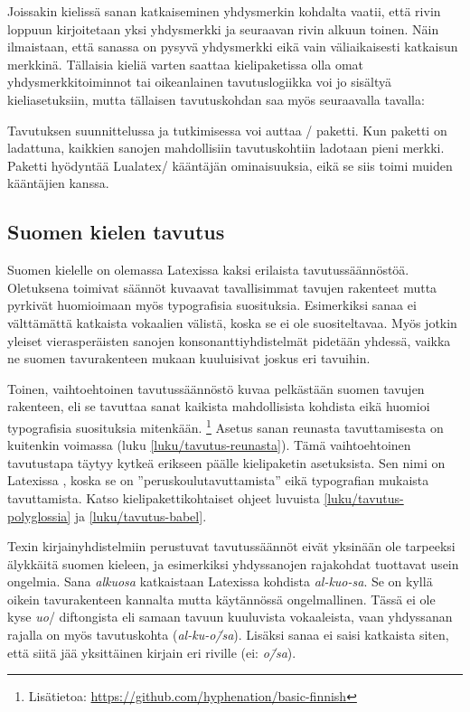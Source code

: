 \noindent
Joissakin kielissä sanan katkaiseminen yhdysmerkin kohdalta vaatii, että
rivin loppuun kirjoitetaan yksi yhdysmerkki ja seuraavan rivin alkuun
toinen. Näin ilmaistaan, että sanassa on pysyvä yhdysmerkki eikä vain
väliaikaisesti katkaisun merkkinä. Tällaisia kieliä varten saattaa
kielipaketissa olla omat yhdysmerkkitoiminnot tai oikeanlainen
tavutuslogiikka voi jo sisältyä kieliasetuksiin, mutta tällaisen
tavutuskohdan saa myös seuraavalla tavalla:

\begin{koodilohkosis}
\discretionary{-}{-}{-}
\end{koodilohkosis}

\noindent
Tavutuksen suunnittelussa ja tutkimisessa voi auttaa
\-/ paketti. Kun paketti on ladattuna,
kaikkien sanojen mahdollisiin tavutuskohtiin ladotaan pieni merkki.
Paketti hyödyntää Lualatex\-/ kääntäjän ominaisuuksia, eikä se siis
toimi muiden kääntäjien kanssa.

\subsection{Suomen kielen tavutus}
\label{luku/suomi-tavutus}

Suomen kielelle on olemassa Latexissa kaksi erilaista tavutussäännöstöä.
Oletuksena toimivat säännöt kuvaavat tavallisimmat tavujen rakenteet
mutta pyrkivät huomioimaan myös typografisia suosituksia. Esimerkiksi
sanaa ei välttämättä katkaista vokaalien välistä, koska se ei ole
suositeltavaa. Myös jotkin yleiset vierasperäisten sanojen
konsonanttiyhdistelmät pidetään yhdessä, vaikka ne suomen tavurakenteen
mukaan kuuluisivat joskus eri tavuihin.

Toinen, vaihtoehtoinen tavutussäännöstö kuvaa pelkästään suomen tavujen
rakenteen, eli se tavuttaa sanat kaikista mahdollisista kohdista eikä
huomioi typografisia suosituksia mitenkään.%
\footnote{Lisätietoa:
  \url{https://github.com/hyphenation/basic-finnish}} Asetus sanan
reunasta tavuttamisesta on kuitenkin voimassa (luku
\ref{luku/tavutus-reunasta}). Tämä vaihtoehtoinen tavutustapa täytyy
kytkeä erikseen päälle kielipaketin asetuksista. Sen nimi on Latexissa
\emph{}, koska se on ''peruskoulutavuttamista'' eikä
typografian mukaista tavuttamista. Katso kielipakettikohtaiset ohjeet
luvuista \ref{luku/tavutus-polyglossia} ja \ref{luku/tavutus-babel}.

Texin kirjainyhdistelmiin perustuvat tavutussäännöt eivät yksinään ole
tarpeeksi älykkäitä suomen kieleen, ja esimerkiksi yhdyssanojen
rajakohdat tuottavat usein ongelmia. Sana \emph{alku\-osa} katkaistaan
Latexissa kohdista \emph{al-kuo-sa}. Se on kyllä oikein tavurakenteen
kannalta mutta käytännössä ongelmallinen. Tässä ei ole kyse \emph{uo}\-/
diftongista eli samaan tavuun kuuluvista vokaaleista, vaan yhdyssanan
rajalla on myös tavutuskohta (\emph{al-ku-o\=/sa}). Lisäksi sanaa ei
saisi katkaista siten, että siitä jää yksittäinen kirjain eri riville
(ei: \emph{o\=/sa}).

